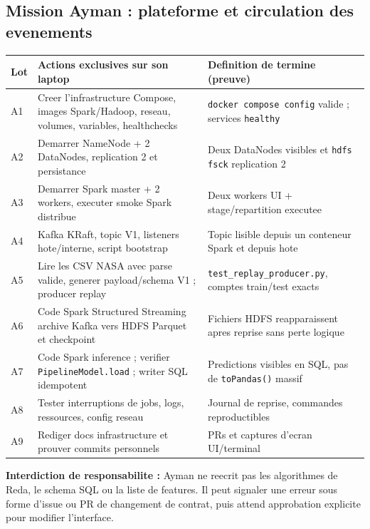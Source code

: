 \documentclass[10pt,a4paper]{article}
\newcommand{\code}[1]{{\small\ttfamily\nolinkurl{#1}}}
\begin{document}
\subsection{Mission Ayman : plateforme et circulation des evenements}
\begin{longtable}{@{}p{15mm}p{80mm}p{54mm}@{}}
\toprule
\textbf{Lot} & \textbf{Actions exclusives sur son laptop} & \textbf{Definition de termine (preuve)}\\\midrule
\endhead
A1 & Creer l'infrastructure Compose, images Spark/Hadoop, reseau, volumes, variables, healthchecks & \code{docker compose config} valide ; services \code{healthy}\\
A2 & Demarrer NameNode + 2 DataNodes, replication 2 et persistance & Deux DataNodes visibles et \code{hdfs fsck} replication 2\\
A3 & Demarrer Spark master + 2 workers, executer smoke Spark distribue & Deux workers UI + stage/repartition executee\\
A4 & Kafka KRaft, topic V1, listeners hote/interne, script bootstrap & Topic lisible depuis un conteneur Spark et depuis hote\\
A5 & Lire les CSV NASA avec parse valide, generer payload/schema V1 ; producer replay & \code{test_replay_producer.py}, comptes train/test exacts\\
A6 & Code Spark Structured Streaming archive Kafka vers HDFS Parquet et checkpoint & Fichiers HDFS reapparaissent apres reprise sans perte logique\\
A7 & Code Spark inference ; verifier \code{PipelineModel.load} ; writer SQL idempotent & Predictions visibles en SQL, pas de \code{toPandas()} massif\\
A8 & Tester interruptions de jobs, logs, ressources, config reseau & Journal de reprise, commandes reproductibles\\
A9 & Rediger docs infrastructure et prouver commits personnels & PRs et captures d'ecran UI/terminal\\
\bottomrule
\end{longtable}
\textbf{Interdiction de responsabilite :} Ayman ne reecrit pas les algorithmes de Reda, le schema SQL ou la liste de features. Il peut signaler une erreur sous forme d'issue ou PR de changement de contrat, puis attend approbation explicite pour modifier l'interface.
\end{document}
